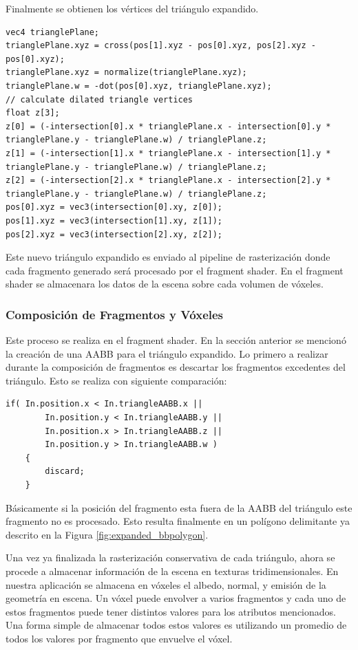 Finalmente se obtienen los vértices del triángulo expandido.
\\
\begin{lstlisting}[caption={Vértices del triángulo expandido.}, label=TPlanes3]
vec4 trianglePlane;
trianglePlane.xyz = cross(pos[1].xyz - pos[0].xyz, pos[2].xyz - pos[0].xyz);
trianglePlane.xyz = normalize(trianglePlane.xyz);
trianglePlane.w = -dot(pos[0].xyz, trianglePlane.xyz);
// calculate dilated triangle vertices
float z[3];
z[0] = (-intersection[0].x * trianglePlane.x - intersection[0].y * trianglePlane.y - trianglePlane.w) / trianglePlane.z;
z[1] = (-intersection[1].x * trianglePlane.x - intersection[1].y * trianglePlane.y - trianglePlane.w) / trianglePlane.z;
z[2] = (-intersection[2].x * trianglePlane.x - intersection[2].y * trianglePlane.y - trianglePlane.w) / trianglePlane.z;
pos[0].xyz = vec3(intersection[0].xy, z[0]);
pos[1].xyz = vec3(intersection[1].xy, z[1]);
pos[2].xyz = vec3(intersection[2].xy, z[2]);
\end{lstlisting}

Este nuevo triángulo expandido es enviado al pipeline de rasterización donde cada fragmento generado será procesado por el fragment shader. En el fragment shader se almacenara los datos de la escena sobre cada volumen de vóxeles.

\subsubsection{Composición de Fragmentos y Vóxeles}

Este proceso se realiza en el fragment shader. En la sección anterior se mencionó la creación de una \ac{AABB} para el triángulo expandido. Lo primero a realizar durante la composición de fragmentos es descartar los fragmentos excedentes del triángulo. Esto se realiza con siguiente comparación:
\\
\begin{lstlisting}[caption={Descarte de fragmentos excedentes en el fragment shader.}, label=TPlanes4]
    if( In.position.x < In.triangleAABB.x || 
    	In.position.y < In.triangleAABB.y || 
		In.position.x > In.triangleAABB.z || 
		In.position.y > In.triangleAABB.w )
	{
		discard;
	}
\end{lstlisting}
Básicamente si la posición del fragmento esta fuera de la \ac{AABB} del triángulo este fragmento no es procesado. Esto resulta finalmente en un polígono delimitante ya descrito en la Figura \ref{fig:expanded_bbpolygon}.

Una vez ya finalizada la rasterización conservativa de cada triángulo, ahora se procede a almacenar información de la escena en texturas tridimensionales. En nuestra aplicación se almacena en vóxeles el albedo, normal, y emisión de la geometría en escena. Un vóxel puede envolver a varios fragmentos y cada uno de estos fragmentos puede tener distintos valores para los atributos mencionados. Una forma simple de almacenar todos estos valores es utilizando un promedio de todos los valores por fragmento que envuelve el vóxel. 

